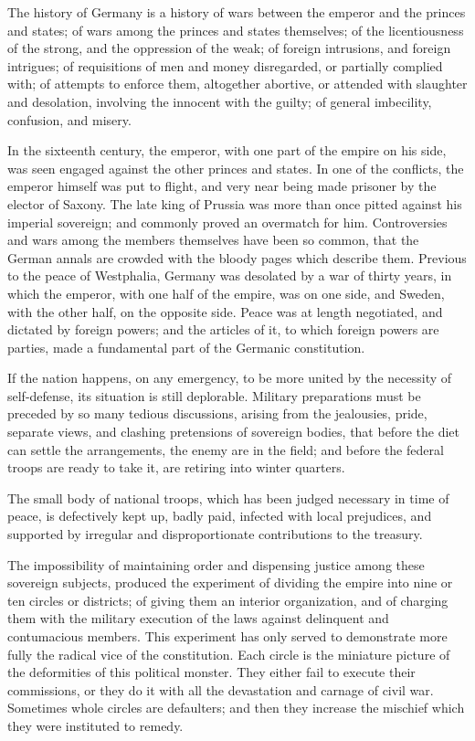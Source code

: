 The history of Germany is a history of wars between the emperor and the princes and states; of wars among the princes and states themselves; of the licentiousness of the strong, and the oppression of the weak; of foreign intrusions, and foreign intrigues; of requisitions of men and money disregarded, or partially complied with; of attempts to enforce them, altogether abortive, or attended with slaughter and desolation, involving the innocent with the guilty; of general imbecility, confusion, and misery.

In the sixteenth century, the emperor, with one part of the empire on his side, was seen engaged against the other princes and states. 
In one of the conflicts, the emperor himself was put to flight, and very near being made prisoner by the elector of Saxony. 
The late king of Prussia was more than once pitted against his imperial sovereign; and commonly proved an overmatch for him. 
Controversies and wars among the members themselves have been so common, that the German annals are crowded with the bloody pages which describe them. 
Previous to the peace of Westphalia, Germany was desolated by a war of thirty years, in which the emperor, with one half of the empire, was on one side, and Sweden, with the other half, on the opposite side. 
Peace was at length negotiated, and dictated by foreign powers; and the articles of it, to which foreign powers are parties, made a fundamental part of the Germanic constitution.

If the nation happens, on any emergency, to be more united by the necessity of self-defense, its situation is still deplorable. 
Military preparations must be preceded by so many tedious discussions, arising from the jealousies, pride, separate views, and clashing pretensions of sovereign bodies, that before the diet can settle the arrangements, the enemy are in the field; and before the federal troops are ready to take it, are retiring into winter quarters.

The small body of national troops, which has been judged necessary in time of peace, is defectively kept up, badly paid, infected with local prejudices, and supported by irregular and disproportionate contributions to the treasury.

The impossibility of maintaining order and dispensing justice among these sovereign subjects, produced the experiment of dividing the empire into nine or ten circles or districts; of giving them an interior organization, and of charging them with the military execution of the laws against delinquent and contumacious members. 
This experiment has only served to demonstrate more fully the radical vice of the constitution. 
Each circle is the miniature picture of the deformities of this political monster. 
They either fail to execute their commissions, or they do it with all the devastation and carnage of civil war. 
Sometimes whole circles are defaulters; and then they increase the mischief which they were instituted to remedy.

